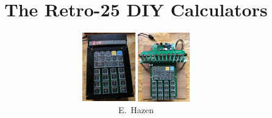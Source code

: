 \documentclass{beamer}
\begin{document}
\hypersetup{urlcolor=my-blue}




\title{The Retro-25 DIY Calculators}
\author
{
 \begin{center}
   \includegraphics[height=3cm]{figs/led_front.jpg} 
   \includegraphics[height=3cm]{figs/vfd_over.jpg}
 \end{center}
E.~Hazen %
}

\newcommand{\spage}[1]{
\begin{frame}
  \begin{tikzpicture}[remember picture, overlay]
  \node[anchor=north]at(current page.north){
     \texttt{[image: \#1]}
  };
  \end{tikzpicture}
\end{frame}
}
\frame{\titlepage}
\end{document}
